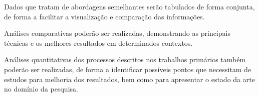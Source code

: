 \documentclass[a4paper,11pt]{article}
\begin{document}
\begin{enumerate}
Dados que tratam de abordagens semelhantes serão tabulados de forma conjunta, de forma a facilitar a visualização e comparação das informações.

Análises comparativas poderão ser realizadas, demonstrando as principais técnicas e os melhores resultados em determinados contextos.

Análises quantitativas dos processos descritos nos trabalhos primários também poderão ser realizadas, de forma a identificar possíveis pontos que necessitam de estudos para melhoria dos resultados, bem como para apresentar o estado da arte no domínio da pesquisa.

\end{enumerate}


\end{document}
